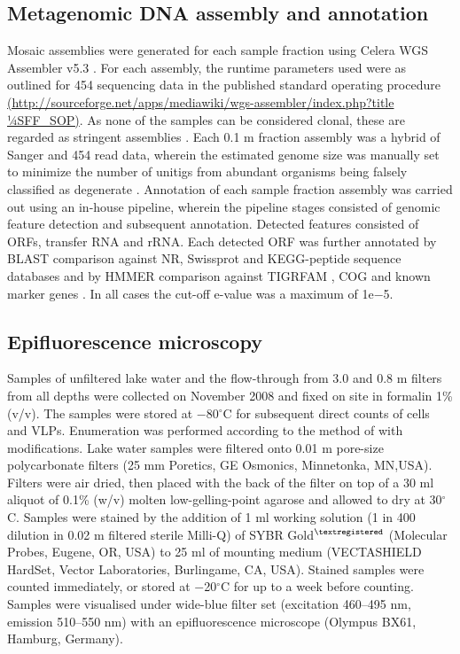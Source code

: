 \subsection{Metagenomic DNA assembly and annotation}
Mosaic assemblies were generated for each sample fraction using Celera \ac{WGS} Assembler v5.3 \cite{Myers2000}. 
For each assembly, the runtime parameters used were as outlined for 454 sequencing data in the published standard operating procedure\\ 
\url{(http://sourceforge.net/apps/mediawiki/wgs-assembler/index.php?title 1⁄4SFF\_SOP)}. 
As none of the samples can be considered clonal, these are regarded as stringent assemblies \cite{Rusch2007}. 
Each 0.1 \textmu{}m fraction assembly was a hybrid of Sanger and 454 read data, wherein the estimated genome size was manually set to minimize the number of unitigs from abundant organisms being falsely classified as degenerate \cite{Rusch2007}. 
Annotation of each sample fraction assembly was carried out using an in-house pipeline, wherein the pipeline stages consisted of genomic feature detection and subsequent annotation. 
Detected features consisted of \acp{ORF}, transfer \acs{RNA} and \ac{rRNA}. 
Each detected \ac{ORF} was further annotated by \ac{BLAST} comparison against \ac{NR}, Swissprot and \ac{KEGG}-peptide sequence databases and by \ac{HMMER} comparison against \ac{TIGRFAM} \cite{Haft2001}, \ac{COG} \cite{Tatusov1997, Tatusov2003} and known marker genes \cite{von Mering2007}.
In all cases the cut-off e-value was a maximum of 1e$-$5. 


\subsection{Epifluorescence microscopy}
Samples of unfiltered lake water and the flow-through from 3.0 and 0.8 \textmu{}m filters from all depths were collected on November 2008 and fixed on site in formalin 1\% (v/v). 
The samples were stored at $-$80$^{\circ}$C for subsequent direct counts of cells and \acp{VLP}. 
Enumeration was performed according to the method of \citet{Patel2007} with modifications. 
Lake water samples were filtered onto 0.01 \textmu{}m pore-size polycarbonate filters (25 mm Poretics, GE Osmonics, Minnetonka, MN,USA). 
Filters were air dried, then placed with the back of the filter on top of a 30 ml aliquot of 0.1\% (w/v) molten low-gelling-point agarose and allowed to dry at 30$^{\circ}$C. 
Samples were stained by the addition of 1 ml working solution (1 in 400 dilution in 0.02 \textmu{}m filtered sterile Milli-Q) of SYBR Gold$^{\textregistered}$ (Molecular Probes, Eugene, OR, USA) to 25 ml of mounting medium (VECTASHIELD HardSet, Vector Laboratories, Burlingame, CA, USA). 
Stained samples were counted immediately, or stored at $-$20$^{\circ}$C for up to a week before counting. 
Samples were visualised under wide-blue filter set (excitation 460--495 nm, emission 510--550 nm) with an epifluorescence microscope (Olympus BX61, Hamburg, Germany).


